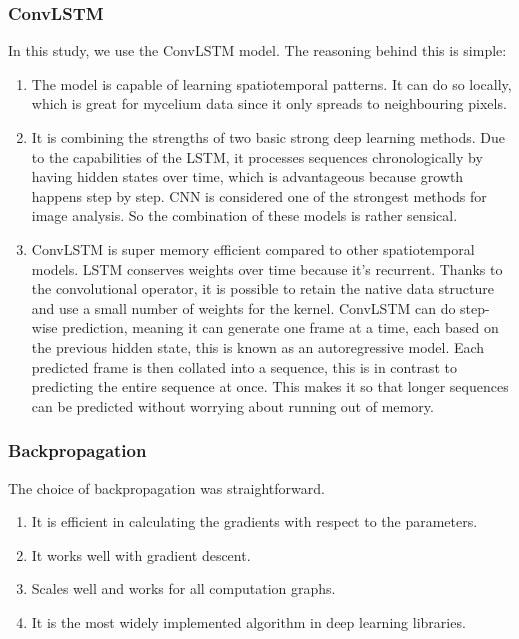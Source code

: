 \documentclass[a4paper,12pt]{article}
\begin{document}
\subsubsection{ConvLSTM}
In this study, we use the ConvLSTM model. The reasoning behind this is simple:
\begin{enumerate}
 \item The model is capable of learning spatiotemporal patterns. It can do so locally, which is great for mycelium data since it only spreads to neighbouring pixels.
 \item It is combining the strengths of two basic strong deep learning methods. Due to the capabilities of the LSTM, it processes sequences chronologically by having hidden states over time, which is advantageous because growth happens step by step. CNN is considered one of the strongest methods for image analysis. So the combination of these models is rather sensical.
 \item ConvLSTM is super memory efficient compared to other spatiotemporal models. LSTM conserves weights over time because it's recurrent. Thanks to the convolutional operator, it is possible to retain the native data structure and use a small number of weights for the kernel. ConvLSTM can do step-wise prediction, meaning it can generate one frame at a time, each based on the previous hidden state, this is known as an autoregressive model. Each predicted frame is then collated into a sequence, this is in contrast to predicting the entire sequence at once. This makes it so that longer sequences can be predicted without worrying about running out of memory.
\end{enumerate}

\subsubsection{Backpropagation}
The choice of backpropagation was straightforward.
\begin{enumerate}
 \item It is efficient in calculating the gradients with respect to the parameters.
 \item It works well with gradient descent.
 \item Scales well and works for all computation graphs.
 \item It is the most widely implemented algorithm in deep learning libraries.
\end{enumerate}
\end{document}
